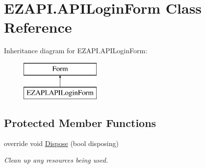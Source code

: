 \hypertarget{class_e_z_a_p_i_1_1_a_p_i_login_form}{\section{E\-Z\-A\-P\-I.\-A\-P\-I\-Login\-Form Class Reference}
\label{class_e_z_a_p_i_1_1_a_p_i_login_form}
}
Inheritance diagram for E\-Z\-A\-P\-I.\-A\-P\-I\-Login\-Form\-:\begin{figure}[H]
\begin{center}
\leavevmode
\includegraphics[height=2.000000cm]{class_e_z_a_p_i_1_1_a_p_i_login_form}
\end{center}
\end{figure}
\subsection*{Protected Member Functions}
\begin{DoxyCompactItemize}
\item 
override void \hyperlink{class_e_z_a_p_i_1_1_a_p_i_login_form_aec62740e38416aa0b40124c8e867fb37}{Dispose} (bool disposing)
\begin{DoxyCompactList}\small\item\em Clean up any resources being used. \end{DoxyCompactList}\end{DoxyCompactItemize}
